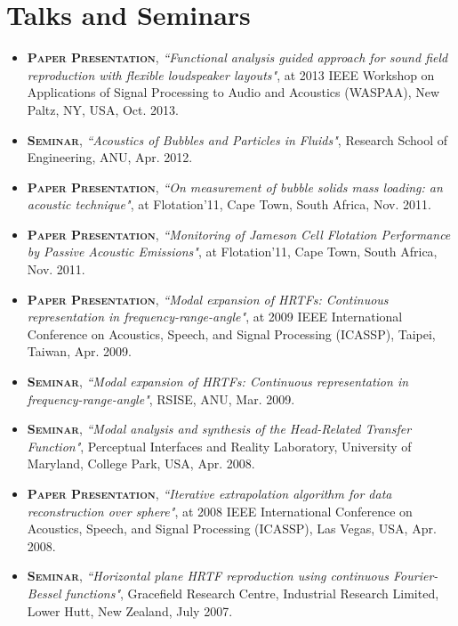 \documentclass[11pt]{article}
\begin{document}
\section*{Talks and Seminars }
%
\begin{itemize}
%
\item \textsc{\textbf{Paper Presentation}},
\emph{``Functional analysis guided approach for sound field reproduction with flexible loudspeaker layouts"}, at 2013
IEEE Workshop on Applications of Signal Processing to Audio and Acoustics (WASPAA), New Paltz, NY, USA, Oct. 2013.

\item \textsc{\textbf{Seminar}},
\emph{``Acoustics of Bubbles and Particles in Fluids"}, Research School of Engineering, ANU, Apr. 2012.

%
\item \textsc{\textbf{Paper Presentation}},
\emph{``On measurement of bubble solids mass loading: an acoustic technique"}, at Flotation'11, Cape Town, South Africa, Nov. 2011.

\item \textsc{\textbf{Paper Presentation}},
\emph{``Monitoring of Jameson Cell Flotation Performance by Passive Acoustic Emissions"}, at Flotation'11, Cape Town, South Africa, Nov. 2011.

\item \textsc{\textbf{Paper Presentation}},
\emph{``Modal expansion of HRTFs: Continuous representation in frequency-range-angle"}, at 2009 IEEE
International Conference on Acoustics, Speech, and Signal Processing (ICASSP), Taipei, Taiwan, Apr. 2009.

\item \textsc{\textbf{Seminar}},
\emph{``Modal expansion of HRTFs: Continuous representation in frequency-range-angle"}, RSISE, ANU, Mar. 2009.

\item \textsc{\textbf{Seminar}},
\emph{``Modal analysis and synthesis of the Head-Related Transfer Function"}, Perceptual Interfaces and Reality
Laboratory, University of Maryland, College Park, USA, Apr. 2008.

\item \textsc{\textbf{Paper Presentation}},
\emph{``Iterative extrapolation algorithm for data reconstruction over sphere"}, at 2008 IEEE International
Conference on Acoustics, Speech, and Signal Processing (ICASSP), Las Vegas, USA, Apr. 2008.

\item \textsc{\textbf{Seminar}},
\emph{``Horizontal plane HRTF reproduction using continuous Fourier-Bessel functions"}, Gracefield Research
Centre, Industrial Research Limited, Lower Hutt, New Zealand, July 2007.


\end{itemize}
\end{document}
